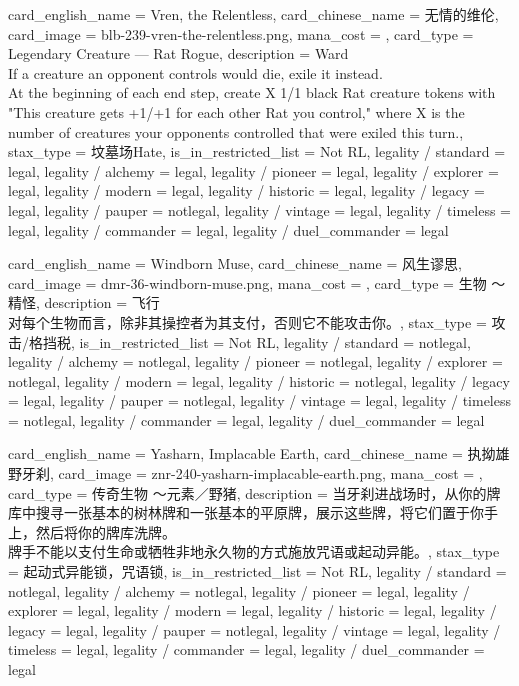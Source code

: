 \documentclass[lang = cn, color = black, 10pt]{AllThatStax}
\begin{document}
\card
{
	card_english_name = {Vren, the Relentless},
	card_chinese_name = {无情的维伦},
	card_image = blb-239-vren-the-relentless.png,
	mana_cost = ,
	card_type = Legendary Creature — Rat Rogue,
	description = {Ward \\
		If a creature an opponent controls would die, exile it instead.\\
		At the beginning of each end step, create X 1/1 black Rat creature tokens with "This creature gets +1/+1 for each other Rat you control," where X is the number of creatures your opponents controlled that were exiled this turn.},
	stax_type = 坟墓场Hate,
	is_in_restricted_list = Not RL,
	legality / standard = legal,
	legality / alchemy = legal,
	legality / pioneer = legal,
	legality / explorer = legal,
	legality / modern = legal,
	legality / historic = legal,
	legality / legacy = legal,
	legality / pauper = notlegal,
	legality / vintage = legal,
	legality / timeless = legal,
	legality / commander = legal,
	legality / duel_commander = legal
}

\card
{
	card_english_name = {Windborn Muse},
	card_chinese_name = {风生谬思},
	card_image = dmr-36-windborn-muse.png,
	mana_cost = ,
	card_type = 生物 ～精怪,
	description = {飞行\\
		对每个生物而言，除非其操控者为其支付，否则它不能攻击你。},
	stax_type = 攻击/格挡税,
	is_in_restricted_list = Not RL,
	legality / standard = notlegal,
	legality / alchemy = notlegal,
	legality / pioneer = notlegal,
	legality / explorer = notlegal,
	legality / modern = legal,
	legality / historic = notlegal,
	legality / legacy = legal,
	legality / pauper = notlegal,
	legality / vintage = legal,
	legality / timeless = notlegal,
	legality / commander = legal,
	legality / duel_commander = legal
}

\card
{
	card_english_name = {Yasharn, Implacable Earth},
	card_chinese_name = {执拗雄野牙刹},
	card_image = znr-240-yasharn-implacable-earth.png,
	mana_cost = ,
	card_type = 传奇生物 ～元素／野猪,
	description = {当牙刹进战场时，从你的牌库中搜寻一张基本的树林牌和一张基本的平原牌，展示这些牌，将它们置于你手上，然后将你的牌库洗牌。\\
		牌手不能以支付生命或牺牲非地永久物的方式施放咒语或起动异能。},
	stax_type = 起动式异能锁，咒语锁,
	is_in_restricted_list = Not RL,
	legality / standard = notlegal,
	legality / alchemy = notlegal,
	legality / pioneer = legal,
	legality / explorer = legal,
	legality / modern = legal,
	legality / historic = legal,
	legality / legacy = legal,
	legality / pauper = notlegal,
	legality / vintage = legal,
	legality / timeless = legal,
	legality / commander = legal,
	legality / duel_commander = legal
}
\end{document}

